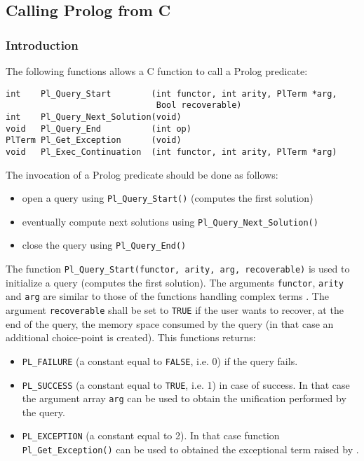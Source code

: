 \subsection{Calling Prolog from C}

\subsubsection{Introduction}
The following functions allows a C function to call a Prolog predicate:

\begin{Indentation}
\begin{verbatim}
int    Pl_Query_Start        (int functor, int arity, PlTerm *arg,
                              Bool recoverable)
int    Pl_Query_Next_Solution(void)
void   Pl_Query_End          (int op)
PlTerm Pl_Get_Exception      (void)
void   Pl_Exec_Continuation  (int functor, int arity, PlTerm *arg)
\end{verbatim}
\end{Indentation}

The invocation of a Prolog predicate should be done as follows:

\begin{itemize}

\item open a query using \texttt{Pl\_Query\_Start()} (computes the first
solution)

\item eventually compute next solutions using
\texttt{Pl\_Query\_Next\_Solution()}

\item close the query using \texttt{Pl\_Query\_End()}

\end{itemize}

The function \texttt{Pl\_Query\_Start(functor, arity, arg, recoverable)} is
used to initialize a query (computes the first solution). The arguments
\texttt{functor}, \texttt{arity} and \texttt{arg} are similar to those of
the functions handling complex terms . The argument \texttt{recoverable} shall be set to
\texttt{TRUE} if the user wants to recover, at the end of the query, the
memory space consumed by the query (in that case an additional choice-point
is created). This functions returns:

\begin{itemize}

\item \texttt{PL\_FAILURE} (a constant equal to \texttt{FALSE}, i.e. 0) if
the query fails.

\item \texttt{PL\_SUCCESS} (a constant equal to \texttt{TRUE}, i.e. 1) in
case of success. In that case the argument array \texttt{arg} can be used to
obtain the unification performed by the query.

\item \texttt{PL\_EXCEPTION} (a constant equal to 2). In that case function
\texttt{Pl\_Get\_Exception()} can be used to obtained the exceptional term
raised by  .

\end{itemize}

